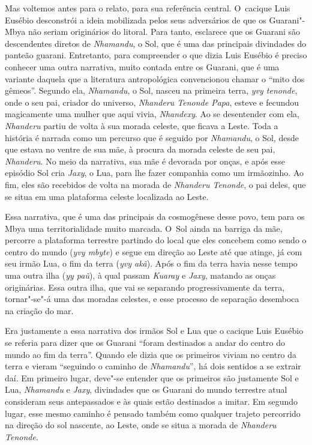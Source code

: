 Mas voltemos antes para o relato, para sua referência central. O~cacique
Luis Eusébio desconstrói a ideia mobilizada pelos seus adversários de
que os Guarani"-Mbya não seriam originários do litoral. Para tanto,
esclarece que os Guarani são descendentes diretos de \emph{Nhamandu}, o Sol,
que é uma das principais divindades do panteão guarani. Entretanto, para compreender o que dizia Luis Eusébio é preciso conhecer
uma outra narrativa, muito contada entre os Guarani, que é uma variante
daquela que a literatura antropológica convencionou chamar o ``mito dos
gêmeos''. Segundo ela, \emph{Nhamandu}, o Sol, nasceu na primeira terra, \emph{yvy
tenonde}, onde o seu pai, criador do universo, \emph{Nhanderu Tenonde Papa},
esteve e fecundou magicamente uma mulher que aqui vivia, \emph{Nhandexy}. Ao
se desentender com ela, \emph{Nhanderu} partiu de volta à sua morada celeste,
que ficava a Leste. Toda a história é narrada como um percurso que é
seguido por \emph{Nhamandu}, o Sol, desde que estava no ventre de sua mãe, à
procura da morada celeste de seu pai, \emph{Nhanderu}. No meio da narrativa,
sua mãe é devorada por onças, e após esse episódio Sol cria \emph{Jaxy}, o
Lua, para lhe fazer companhia como um irmãozinho. Ao fim, eles são
recebidos de volta na morada de \emph{Nhanderu Tenonde}, o pai deles, que se
situa em uma plataforma celeste localizada ao Leste.

Essa narrativa, que é uma das principais da cosmogênese desse povo, tem
para os Mbya uma territorialidade muito marcada. O~Sol ainda na barriga
da mãe, percorre a plataforma terrestre partindo do local que eles
concebem como sendo o centro do mundo (\emph{yvy mbyte}) e segue em direção ao
Leste até que atinge, já com seu irmão Lua, o fim da terra (\emph{yvy akã}).
Após o fim da terra havia nesse tempo uma outra ilha (\emph{yy paũ}), à qual
passam \emph{Kuaray} e \emph{Jaxy}, matando as onças originárias. Essa outra ilha,
que vai se separando progressivamente da terra, tornar"-se"-á uma das
moradas celestes, e esse processo de separação desemboca na criação do
mar. 

Era justamente a essa narrativa dos irmãos Sol e Lua que o cacique Luis
Eusébio se referia para dizer que os Guarani ``foram destinados a andar
do centro do mundo ao fim da terra''. Quando ele dizia que os primeiros
viviam no centro da terra e vieram ``seguindo o caminho de \emph{Nhamandu}'', há
dois sentidos a se extrair daí. Em primeiro lugar, deve"-se entender que
os primeiros são justamente Sol e Lua, \emph{Nhamandu} e \emph{Jaxy}, divindades que
os Guarani do mundo terrestre atual consideram seus antepassados e às
quais estão destinados a imitar. Em segundo lugar, esse mesmo caminho é
pensado também como qualquer trajeto percorrido na direção do sol
nascente, ao Leste, onde se situa a morada de \emph{Nhanderu Tenonde}.

